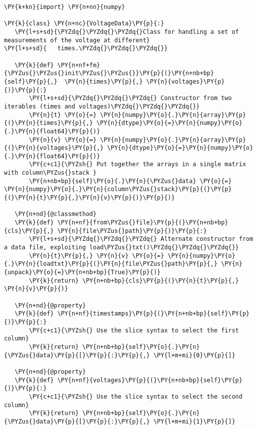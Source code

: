 \begin{Verbatim}[label=\makebox{\url{https://github.com/lucabaldini/cmepda/tree/master/slides/latex/snippets/voltage\_data\_1.py}},commandchars=\\\{\}]
\PY{k+kn}{import} \PY{n+nn}{numpy}

\PY{k}{class} \PY{n+nc}{VoltageData}\PY{p}{:}
   \PY{l+s+sd}{\PYZdq{}\PYZdq{}\PYZdq{}Class for handling a set of measurements of the voltage at different}
\PY{l+s+sd}{   times.\PYZdq{}\PYZdq{}\PYZdq{}}
   
   \PY{k}{def} \PY{n+nf+fm}{\PYZus{}\PYZus{}init\PYZus{}\PYZus{}}\PY{p}{(}\PY{n+nb+bp}{self}\PY{p}{,}  \PY{n}{times}\PY{p}{,} \PY{n}{voltages}\PY{p}{)}\PY{p}{:}
       \PY{l+s+sd}{\PYZdq{}\PYZdq{}\PYZdq{} Constructor from two iterables (times and voltages)\PYZdq{}\PYZdq{}\PYZdq{}}
       \PY{n}{t} \PY{o}{=} \PY{n}{numpy}\PY{o}{.}\PY{n}{array}\PY{p}{(}\PY{n}{times}\PY{p}{,} \PY{n}{dtype}\PY{o}{=}\PY{n}{numpy}\PY{o}{.}\PY{n}{float64}\PY{p}{)}
       \PY{n}{v} \PY{o}{=} \PY{n}{numpy}\PY{o}{.}\PY{n}{array}\PY{p}{(}\PY{n}{voltages}\PY{p}{,} \PY{n}{dtype}\PY{o}{=}\PY{n}{numpy}\PY{o}{.}\PY{n}{float64}\PY{p}{)}
       \PY{c+c1}{\PYZsh{} Put together the arrays in a single matrix with column\PYZus{}stack }
       \PY{n+nb+bp}{self}\PY{o}{.}\PY{n}{\PYZus{}data} \PY{o}{=} \PY{n}{numpy}\PY{o}{.}\PY{n}{column\PYZus{}stack}\PY{p}{(}\PY{p}{(}\PY{n}{t}\PY{p}{,}\PY{n}{v}\PY{p}{)}\PY{p}{)}
   
   \PY{n+nd}{@classmethod}
   \PY{k}{def} \PY{n+nf}{from\PYZus{}file}\PY{p}{(}\PY{n+nb+bp}{cls}\PY{p}{,} \PY{n}{file\PYZus{}path}\PY{p}{)}\PY{p}{:}
       \PY{l+s+sd}{\PYZdq{}\PYZdq{}\PYZdq{} Alternate constructor from a data file, exploiting load\PYZus{}txt()\PYZdq{}\PYZdq{}\PYZdq{}}
       \PY{n}{t}\PY{p}{,} \PY{n}{v} \PY{o}{=} \PY{n}{numpy}\PY{o}{.}\PY{n}{loadtxt}\PY{p}{(}\PY{n}{file\PYZus{}path}\PY{p}{,} \PY{n}{unpack}\PY{o}{=}\PY{n+nb+bp}{True}\PY{p}{)}
       \PY{k}{return} \PY{n+nb+bp}{cls}\PY{p}{(}\PY{n}{t}\PY{p}{,} \PY{n}{v}\PY{p}{)}   
   
   \PY{n+nd}{@property}
   \PY{k}{def} \PY{n+nf}{timestamps}\PY{p}{(}\PY{n+nb+bp}{self}\PY{p}{)}\PY{p}{:}
       \PY{c+c1}{\PYZsh{} Use the slice syntax to select the first column}
       \PY{k}{return} \PY{n+nb+bp}{self}\PY{o}{.}\PY{n}{\PYZus{}data}\PY{p}{[}\PY{p}{:}\PY{p}{,} \PY{l+m+mi}{0}\PY{p}{]}
   
   \PY{n+nd}{@property}
   \PY{k}{def} \PY{n+nf}{voltages}\PY{p}{(}\PY{n+nb+bp}{self}\PY{p}{)}\PY{p}{:}
       \PY{c+c1}{\PYZsh{} Use the slice syntax to select the second column}
       \PY{k}{return} \PY{n+nb+bp}{self}\PY{o}{.}\PY{n}{\PYZus{}data}\PY{p}{[}\PY{p}{:}\PY{p}{,} \PY{l+m+mi}{1}\PY{p}{]}
\end{Verbatim}
